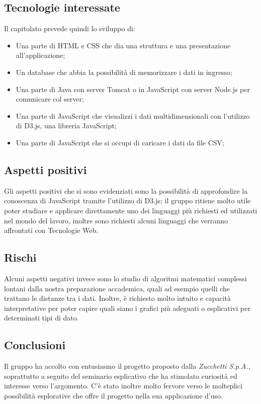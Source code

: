 \documentclass[../studio_di_fattibilita.tex]{subfiles}
\begin{document}
\subsection{Tecnologie interessate}%
\label{sub:c4_tecnologie_interessate}
Il capitolato prevede quindi lo sviluppo di:
\begin{itemize}
	\item Una parte di HTML e CSS che dia una struttura e una presentazione all’applicazione;
	\item Un database che abbia la possibilità di memorizzare i dati in ingresso;
	\item Una parte di Java con server Tomcat o in JavaScript con server Node.js per comunicare col server;
	\item Una parte di JavaScript che visualizzi i dati multidimensionali con l'utilizzo di D3.js, una libreria JavaScript;
	\item Una parte di JavaScript che si occupi di caricare i dati da file CSV;
\end{itemize}

\subsection{Aspetti positivi}%
\label{sub:c4_aspetti_positivi}
Gli aspetti positivi che si sono evidenziati sono la possibilità di approfondire la conoscenza di JavaScript tramite l’utilizzo di D3.js; il gruppo ritiene molto utile poter studiare e applicare direttamente uno dei linguaggi più richiesti ed utilizzati nel mondo del lavoro, inoltre sono richiesti alcuni linguaggi che verranno affrontati con Tecnologie Web.


\subsection{Rischi}%
\label{sub:c4_rischi}
Alcuni aspetti negativi invece sono lo studio di algoritmi matematici complessi lontani dalla nostra preparazione accademica, quali ad esempio quelli che trattano le distanze tra i dati. Inoltre, è richiesto molto intuito e capacità interpretative per poter capire quali siano i grafici più adeguati o esplicativi per determinati tipi di dato.

\subsection{Conclusioni}%
\label{sub:c4_conclusioni}
Il gruppo ha accolto con entusiasmo il progetto proposto dalla \emph{Zucchetti S.p.A.}, soprattutto a seguito del seminario esplicativo che ha stimolato curiosità ed interesse verso l’argomento. C’è stato inoltre molto fervore verso le molteplici possibilità esplorative che offre il progetto nella sua applicazione d’uso.
\end{document}
